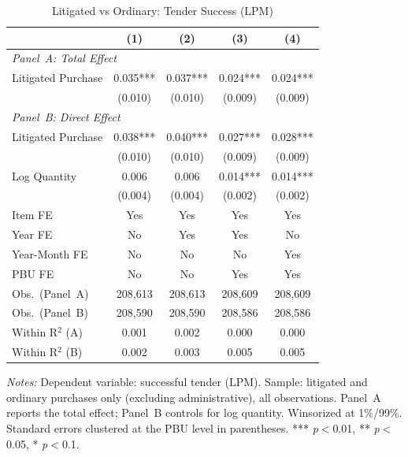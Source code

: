 \begin{table}[ht]
  \centering
  \caption{Litigated vs Ordinary: Tender Success (LPM)}
  \label{tab:t2_lit_success}
  \small
  \begin{threeparttable}
  \begin{tabular}{lcccc}
    \hline\hline
    & (1) & (2) & (3) & (4) \\
    \hline
    \multicolumn{5}{l}{\textit{Panel~A: Total Effect}} \\[3pt]
    Litigated Purchase & 0.035*** & 0.037*** & 0.024*** & 0.024*** \\
     & (0.010) & (0.010) & (0.009) & (0.009) \\[3pt]
    \hline
    \multicolumn{5}{l}{\textit{Panel~B: Direct Effect}} \\[3pt]
    Litigated Purchase & 0.038*** & 0.040*** & 0.027*** & 0.028*** \\
     & (0.010) & (0.010) & (0.009) & (0.009) \\[3pt]
    Log Quantity & 0.006 & 0.006 & 0.014*** & 0.014*** \\
     & (0.004) & (0.004) & (0.002) & (0.002) \\[3pt]
    \hline
    Item FE & Yes & Yes & Yes & Yes \\
    Year FE & No & Yes & Yes & No \\
    Year-Month FE & No & No & No & Yes \\
    PBU FE & No & No & Yes & Yes \\
    Obs.\ (Panel~A) & 208,613 & 208,613 & 208,609 & 208,609 \\
    Obs.\ (Panel~B) & 208,590 & 208,590 & 208,586 & 208,586 \\
    Within R$^2$ (A) & 0.001 & 0.002 & 0.000 & 0.000 \\
    Within R$^2$ (B) & 0.002 & 0.003 & 0.005 & 0.005 \\
    \hline\hline
  \end{tabular}
  \begin{tablenotes}
    \small
    \item \textit{Notes:} Dependent variable: successful tender (LPM). Sample: litigated and ordinary purchases only (excluding administrative), all observations. Panel~A reports the total effect; Panel~B controls for log quantity. Winsorized at 1\%/99\%. Standard errors clustered at the PBU level in parentheses. *** \textit{p}$<$0.01, ** \textit{p}$<$0.05, * \textit{p}$<$0.1.
  \end{tablenotes}
  \end{threeparttable}
\end{table}
